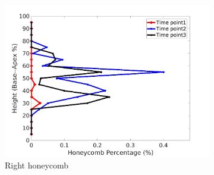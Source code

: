 \begin{figure}[H]
\begin{subfigure}{.42\linewidth}
  \includegraphics[width=\linewidth,trim={{.0\wd0} {.0\wd0} {.0\wd0} {.0\wd0}},clip]{Appendix/Image_AppexA/BaseToApex/IPF21RightLungHoneycombDiseaseAgainstHeight.jpg}
  \caption{Right honeycomb}
  \label{fig:IPF21DiseaseAgainstHeight-f}
\end{subfigure}
\begin{subfigure}{.42\linewidth}%

\end{subfigure}
\end{figure}
